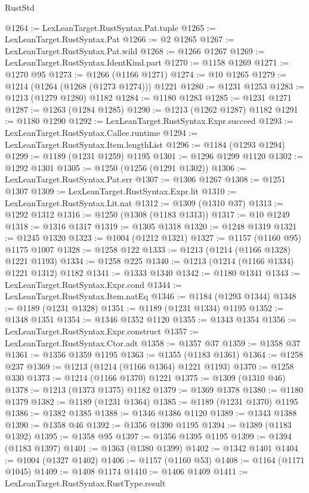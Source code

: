 \begin{lexlean}{RustStd}
\begin{coremodule}
@1264 := LexLeanTarget.RustSyntax.Pat.tuple
@1265 := LexLeanTarget.RustSyntax.Pat
@1266 := @2 @1265
@1267 := LexLeanTarget.RustSyntax.Pat.wild
@1268 := @1266 @1267
@1269 := LexLeanTarget.RustSyntax.IdentKind.part
@1270 := @1158 @1269
@1271 := @1270 @95
@1273 := @1266 (@1166 @1271)
@1274 := @10 @1265
@1279 := @1214 (@1264 (@1268 (@1273 @1274))) @1221
@1280 := @1231 @1253
@1283 := @1213 (@1279 @1280) @1182
@1284 := @1180 @1283
@1285 := @1231 @1271
@1287 := @1263 (@1284 @1285)
@1290 := @1213 (@1262 @1287) @1182
@1291 := @1180 @1290
@1292 := LexLeanTarget.RustSyntax.Expr.succeed
@1293 := LexLeanTarget.RustSyntax.Callee.runtime
@1294 := LexLeanTarget.RustSyntax.Item.lengthList
@1296 := @1184 (@1293 @1294)
@1299 := @1189 (@1231 @1259) @1195
@1301 := @1296 @1299 @1120
@1302 := @1292 @1301
@1305 := @1250 (@1256 (@1291 @1302))
@1306 := LexLeanTarget.RustSyntax.Pat.err
@1307 := @1306 @1267
@1308 := @1251 @1307
@1309 := LexLeanTarget.RustSyntax.Expr.lit
@1310 := LexLeanTarget.RustSyntax.Lit.nat
@1312 := @1309 (@1310 @37)
@1313 := @1292 @1312
@1316 := @1250 (@1308 (@1183 @1313))
@1317 := @10 @1249
@1318 := @1316 @1317
@1319 := @1305 @1318
@1320 := @1248 @1319
@1321 := @1245 @1320
@1323 := @1004 (@1212 @1321)
@1327 := @1157 (@1160 @95) @1175 @1007
@1328 := @1258 @122
@1333 := @1213 (@1214 (@1166 @1328) @1221 @1193)
@1334 := @1258 @225
@1340 := @1213 (@1214 (@1166 @1334) @1221 @1312) @1182
@1341 := @1333 @1340
@1342 := @1180 @1341
@1343 := LexLeanTarget.RustSyntax.Expr.cond
@1344 := LexLeanTarget.RustSyntax.Item.natEq
@1346 := @1184 (@1293 @1344)
@1348 := @1189 (@1231 @1328)
@1351 := @1189 (@1231 @1334) @1195
@1352 := @1348 @1351
@1354 := @1346 @1352 @1120
@1355 := @1343 @1354
@1356 := LexLeanTarget.RustSyntax.Expr.construct
@1357 := LexLeanTarget.RustSyntax.Ctor.adt
@1358 := @1357 @37
@1359 := @1358 @37
@1361 := @1356 @1359 @1195
@1363 := @1355 (@1183 @1361)
@1364 := @1258 @237
@1369 := @1213 (@1214 (@1166 @1364) @1221 @1193)
@1370 := @1258 @330
@1373 := @1214 (@1166 @1370) @1221
@1375 := @1309 (@1310 @46)
@1378 := @1213 (@1373 @1375) @1182
@1379 := @1369 @1378
@1380 := @1180 @1379
@1382 := @1189 (@1231 @1364)
@1385 := @1189 (@1231 @1370) @1195
@1386 := @1382 @1385
@1388 := @1346 @1386 @1120
@1389 := @1343 @1388
@1390 := @1358 @46
@1392 := @1356 @1390 @1195
@1394 := @1389 (@1183 @1392)
@1395 := @1358 @95
@1397 := @1356 @1395 @1195
@1399 := @1394 (@1183 @1397)
@1401 := @1363 (@1380 @1399)
@1402 := @1342 @1401
@1404 := @1004 (@1327 @1402)
@1406 := @1157 (@1160 @53)
@1408 := @1164 (@1171 @1045)
@1409 := @1408 @1174
@1410 := @1406 @1409
@1411 := LexLeanTarget.RustSyntax.RustType.result

\end{coremodule}
\end{lexlean}
